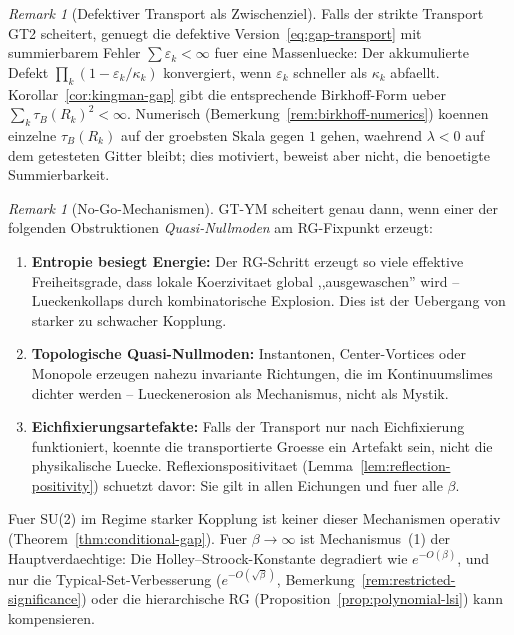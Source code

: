 \documentclass[12pt,a4paper]{article}
\theoremstyle{definition}
\theoremstyle{plain}
\theoremstyle{remark}
\newtheorem{remark}[definition]{Remark}
\begin{document}
\begin{remark}[Defektiver Transport als Zwischenziel]\label{rem:defective-transport}
Falls der strikte Transport GT2 scheitert, genuegt die defektive Version~\eqref{eq:gap-transport} mit summierbarem Fehler $\sum \varepsilon_k < \infty$ fuer eine Massenluecke: Der akkumulierte Defekt $\prod_k (1 - \varepsilon_k / \kappa_k)$ konvergiert, wenn $\varepsilon_k$ schneller als $\kappa_k$ abfaellt. Korollar~\ref{cor:kingman-gap} gibt die entsprechende Birkhoff-Form ueber $\sum_k\tau_B(R_k)^2<\infty$. Numerisch (Bemerkung~\ref{rem:birkhoff-numerics}) koennen einzelne $\tau_B(R_k)$ auf der groebsten Skala gegen $1$ gehen, waehrend $\lambda < 0$ auf dem getesteten Gitter bleibt; dies motiviert, beweist aber nicht, die benoetigte Summierbarkeit.
\end{remark}

\begin{remark}[No-Go-Mechanismen]\label{rem:gt-nogo}
GT-YM scheitert genau dann, wenn einer der folgenden Obstruktionen \emph{Quasi-Nullmoden} am RG-Fixpunkt erzeugt:
\begin{enumerate}
\item \textbf{Entropie besiegt Energie:} Der RG-Schritt erzeugt so viele effektive Freiheitsgrade, dass lokale Koerzivitaet global ,,ausgewaschen'' wird -- Lueckenkollaps durch kombinatorische Explosion. Dies ist der Uebergang von starker zu schwacher Kopplung.
\item \textbf{Topologische Quasi-Nullmoden:} Instantonen, Center-Vortices oder Monopole erzeugen nahezu invariante Richtungen, die im Kontinuumslimes dichter werden -- Lueckenerosion als Mechanismus, nicht als Mystik.
\item \textbf{Eichfixierungsartefakte:} Falls der Transport nur nach Eichfixierung funktioniert, koennte die transportierte Groesse ein Artefakt sein, nicht die physikalische Luecke. Reflexionspositivitaet (Lemma~\ref{lem:reflection-positivity}) schuetzt davor: Sie gilt in allen Eichungen und fuer alle $\beta$.
\end{enumerate}
Fuer SU(2) im Regime starker Kopplung ist keiner dieser Mechanismen operativ (Theorem~\ref{thm:conditional-gap}). Fuer $\beta \to \infty$ ist Mechanismus~(1) der Hauptverdaechtige: Die Holley--Stroock-Konstante degradiert wie $e^{-O(\beta)}$, und nur die Typical-Set-Verbesserung ($e^{-O(\sqrt{\beta})}$, Bemerkung~\ref{rem:restricted-significance}) oder die hierarchische RG (Proposition~\ref{prop:polynomial-lsi}) kann kompensieren.
\end{remark}
\end{document}
